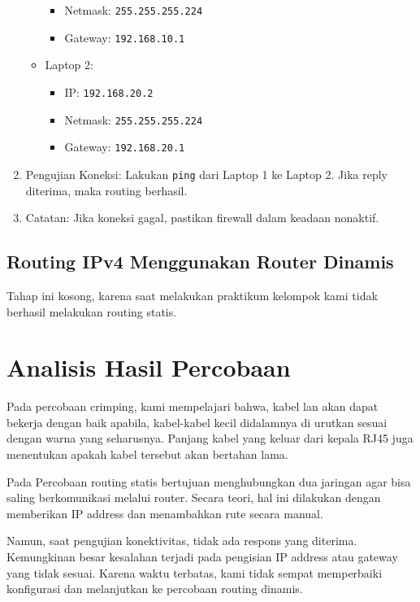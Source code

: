 \begin{enumerate}
\begin{itemize}
\begin{itemize}
      \item Netmask: \texttt{255.255.255.224}
      \item Gateway: \texttt{192.168.10.1}
    \end{itemize}
    \item Laptop 2:
    \begin{itemize}
      \item IP: \texttt{192.168.20.2}
      \item Netmask: \texttt{255.255.255.224}
      \item Gateway: \texttt{192.168.20.1}
    \end{itemize}
  \end{itemize}
  \item {Pengujian Koneksi:} Lakukan \texttt{ping} dari Laptop 1 ke Laptop 2. Jika reply diterima, maka routing berhasil.
  \item {Catatan:} Jika koneksi gagal, pastikan firewall dalam keadaan nonaktif.
\end{enumerate}

\subsection{Routing IPv4 Menggunakan Router Dinamis}
Tahap ini kosong, karena saat melakukan praktikum kelompok kami tidak berhasil melakukan routing statis.



\section{Analisis Hasil Percobaan}
Pada percobaan crimping, kami mempelajari bahwa, kabel lan akan dapat bekerja dengan baik apabila, kabel-kabel kecil didalamnya di urutkan sesuai dengan warna yang seharusnya. Panjang kabel yang keluar dari kepala RJ45 juga menentukan apakah kabel tersebut akan bertahan lama.  

Pada Percobaan routing statis bertujuan menghubungkan dua jaringan agar bisa saling berkomunikasi melalui router. Secara teori, hal ini dilakukan dengan memberikan IP address dan menambahkan rute secara manual.

Namun, saat pengujian konektivitas, tidak ada respons yang diterima. Kemungkinan besar kesalahan terjadi pada pengisian IP address atau gateway yang tidak sesuai. Karena waktu terbatas, kami tidak sempat memperbaiki konfigurasi dan melanjutkan ke percobaan routing dinamis.


